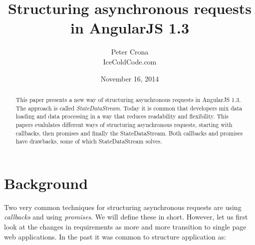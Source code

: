 \documentclass[a4paper,12pt]{article}
\begin{document}
\graphicspath{ {./images/} }

\lstset{
   language=JavaScript,
   extendedchars=true,
   basicstyle=\footnotesize\ttfamily,
   showstringspaces=false,
   showspaces=false,
   numbers=left,
   numberstyle=\footnotesize,
   numbersep=9pt,
   tabsize=2,
   breaklines=true,
   showtabs=false,
   captionpos=b
}

\title{Structuring asynchronous requests in AngularJS 1.3}
\date{November 16, 2014}
\author{Peter Crona\\ IceColdCode.com}
\maketitle

\begin{abstract}
This paper presents a new way of structuring asynchronous requests in AngularJS 1.3. The approach is
called \emph{StateDataStream}. Today it is common that developers mix data loading and data processing in a way that reduces readability and flexibility. 
This papers evalulates different ways of structuring asynchronous requests, starting with callbacks, then promises and finally the StateDataStream.
Both callbacks and promises have drawbacks, some of which StateDataStream solves.
\end{abstract}
\clearpage

\afterpage{\null\newpage}
\clearpage

\tableofcontents
\clearpage

\afterpage{\null\newpage}
\clearpage

\section{Background}
Two very common techniques for structuring asynchronous requests are using \emph{callbacks} and using \emph{promises}.
We will define these in short. However, let us first look at the changes in requirements as more and more transition to single page web applications.
In the past it was common to structure application as:
\end{document}
